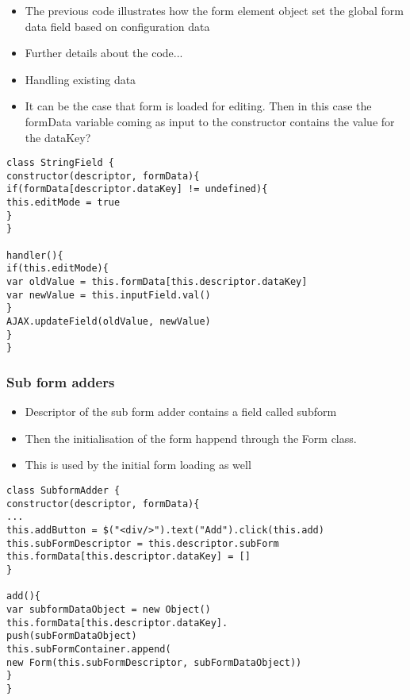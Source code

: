 \begin{itemize}
	\item The previous code illustrates how the form element object set the global form data field based on configuration data
	\item Further details about the code...
\end{itemize}

\begin{itemize}
	\item Handling existing data
	\item It can be the case that form is loaded for editing. Then in this case the formData variable coming as input to the constructor contains the value for the dataKey? 
\end{itemize}

\begin{lstlisting}[basicstyle=\footnotesize, frame=single, caption={Data saving}, captionpos=b]
class StringField {
constructor(descriptor, formData){
if(formData[descriptor.dataKey] != undefined){
this.editMode = true
}
}

handler(){
if(this.editMode){
var oldValue = this.formData[this.descriptor.dataKey]
var newValue = this.inputField.val() 
}
AJAX.updateField(oldValue, newValue)
}			
}
\end{lstlisting}


\subsubsection{Sub form adders}


\begin{itemize}
	\item Descriptor of the sub form adder contains a field called subform
	\item Then the initialisation of the form happend through the Form class.	
	\item This is used by the initial form loading as well
\end{itemize}

\begin{lstlisting}[basicstyle=\footnotesize, frame=single, caption={Sub form adder routine}, captionpos=b]
class SubformAdder {
constructor(descriptor, formData){
...
this.addButton = $("<div/>").text("Add").click(this.add)    
this.subFormDescriptor = this.descriptor.subForm
this.formData[this.descriptor.dataKey] = []
}

add(){
var subformDataObject = new Object()
this.formData[this.descriptor.dataKey].
push(subFormDataObject) 
this.subFormContainer.append(
new Form(this.subFormDescriptor, subFormDataObject))
}
}
\end{lstlisting}


